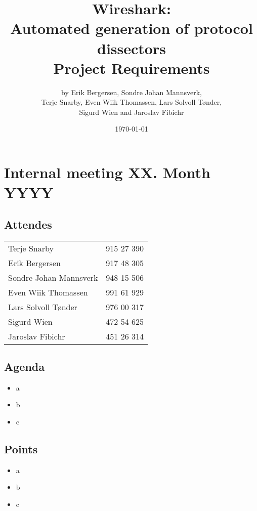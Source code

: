 \documentclass[a4paper, 11pt]{report}
\title{Wireshark:\\ Automated generation of protocol dissectors\\
		Project Requirements}
\author{by Erik Bergersen, Sondre Johan Mannsverk,\\ Terje Snarby,
		Even Wiik Thomassen, Lars Solvoll Tønder,\\ Sigurd Wien
		and Jaroslav Fibichr}
\date{\today}
\begin{document}
\section*{Internal meeting XX. Month YYYY}

\subsection*{Attendes}

\begin{tabular}{l  l}
	Terje Snarby & 915 27 390 \\
	Erik Bergersen & 917 48 305 \\
	Sondre Johan Mannsverk & 948 15 506 \\
	Even Wiik Thomassen & 991 61 929 \\
	Lars Solvoll Tønder & 976 00 317 \\
	Sigurd Wien & 472 54 625 \\
	Jaroslav Fibichr & 451 26 314 \\
\end{tabular}

\subsection*{Agenda}

\begin{itemize}
	\item a
	\item b
	\item c
\end{itemize}

\subsection*{Points}

\begin{itemize}
	\item a
	\item b
	\item c
\end{itemize}
\end{document}
